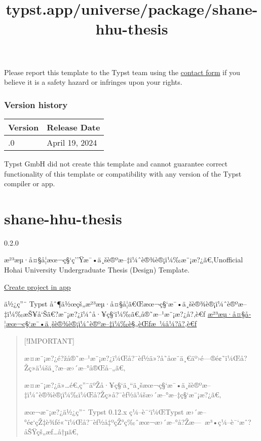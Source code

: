 Please report this template to the Typst team using the
\href{https://typst.app/contact}{contact form} if you believe it is a
safety hazard or infringes upon your rights.

\label{versions}
\subsubsection{Version history}\label{version-history}

\begin{longtable}[]{@{}ll@{}}
\toprule\noalign{}
Version & Release Date \\
\midrule\noalign{}
\endhead
\bottomrule\noalign{}
\endlastfoot
0.4.0 & April 19, 2024 \\
\end{longtable}

Typst GmbH did not create this template and cannot guarantee correct
functionality of this template or compatibility with any version of the
Typst compiler or app.


\title{typst.app/universe/package/shane-hhu-thesis}

\label{banner}
\label{template-thumbnail}

\section{shane-hhu-thesis}\label{shane-hhu-thesis}

{ 0.2.0 }

æ²³æµ·å¤§å­¦æœ¬ç§`ç''Ÿæ¯•ä¸šè®ºæ--‡ï¼ˆè®¾è®¡ï¼‰æ¨¡æ?¿ã€‚Unofficial Hohai
University Undergraduate Thesis (Design) Template.

\href{/app?template=shane-hhu-thesis&version=0.2.0}{Create project in
app}

\label{readme}
ä½¿ç''¨ Typst
åˆ¶ä½œçš„æ²³æµ·å¤§å­¦ã€Œæœ¬ç§`æ¯•ä¸šè®¾è®¡ï¼ˆè®ºæ--‡ï¼‰æŠ¥å`Šã€?æ¨¡æ?¿ï¼ˆå·¥ç§`ï¼‰ã€‚å®˜æ--¹æ¨¡æ?¿å?‚è€ƒ
\href{https://bylw.hhu.edu.cn/UpLoadFile/83cd5f1169974a0db06d865c7ee11af4.pdf}{æ²³æµ·å¤§å­¦æœ¬ç§`æ¯•ä¸šè®¾è®¡ï¼ˆè®ºæ--‡ï¼‰è§„èŒƒæ~¼å¼?å?‚è€ƒ}

\begin{quote}
{[}!IMPORTANT{]}

æ­¤æ¨¡æ?¿é?žå®˜æ--¹æ¨¡æ?¿ï¼Œå?¯èƒ½ä»?å­˜åœ¨ä¸€äº›é---®é¢˜ï¼Œå?Žç»­ä¼šä¸?æ--­æ›´æ--°å®Œå--„ã€‚

æ­¤æ¨¡æ?¿ä»\ldots é€‚ç''¨äºŽå·¥ç§`ä¸``ä¸šæœ¬ç§`æ¯•ä¸šè®ºæ--‡ï¼ˆè®¾è®¡ï¼‰ï¼Œå?Žç»­å?¯èƒ½ä¼šæ›´æ--°æ--‡ç§`æ¨¡æ?¿ã€‚

æœ¬æ¨¡æ?¿ä½¿ç''¨ Typst 0.12.x ç¼--è¯`ï¼ŒTypst
æ›´æ--°é¢`çŽ‡è¾ƒé«˜ï¼Œå?¯èƒ½å‡ºçŽ°ç‰ˆæœ¬æ›´æ--°å?Žæ---~æ³•ç¼--è¯`æˆ?åŠŸçš„æƒ\ldots å†µã€‚
\end{quote}

